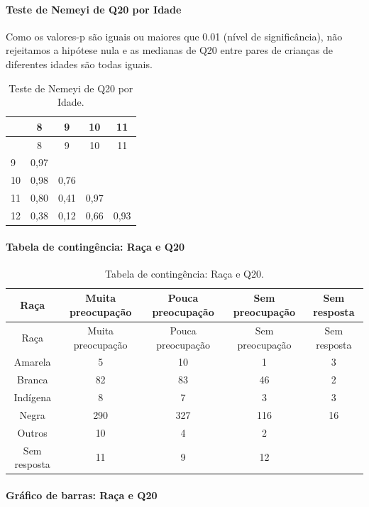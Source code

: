 \documentclass[]{article}
\let\oldparagraph\paragraph
\renewcommand{\paragraph}[1]{\oldparagraph{#1}\mbox{}}
\begin{document}
\hypertarget{teste-de-nemeyi-de-q20-por-idade}{%
\paragraph{Teste de Nemeyi de Q20 por Idade}\label{teste-de-nemeyi-de-q20-por-idade}}

Como os valores-p são iguais ou maiores que 0.01 (nível de significância), não rejeitamos a hipótese nula e as medianas de Q20 entre pares de crianças de diferentes idades são todas iguais.

\begin{longtable}[]{@{}lcccc@{}}
\caption{\label{tab:unnamed-chunk-396}Teste de Nemeyi de Q20 por Idade.}\tabularnewline
\toprule
& 8 & 9 & 10 & 11\tabularnewline
\midrule
\endfirsthead
\toprule
& 8 & 9 & 10 & 11\tabularnewline
\midrule
\endhead
9 & 0,97 & & &\tabularnewline
10 & 0,98 & 0,76 & &\tabularnewline
11 & 0,80 & 0,41 & 0,97 &\tabularnewline
12 & 0,38 & 0,12 & 0,66 & 0,93\tabularnewline
\bottomrule
\end{longtable}

\cleardoublepage

\hypertarget{tabela-de-continguxeancia-rauxe7a-e-q20}{%
\paragraph{Tabela de contingência: Raça e Q20}\label{tabela-de-continguxeancia-rauxe7a-e-q20}}

\begin{longtable}[]{@{}ccccc@{}}
\caption{\label{tab:unnamed-chunk-397}Tabela de contingência: Raça e Q20.}\tabularnewline
\toprule
Raça & Muita preocupação & Pouca preocupação & Sem preocupação & Sem resposta\tabularnewline
\midrule
\endfirsthead
\toprule
Raça & Muita preocupação & Pouca preocupação & Sem preocupação & Sem resposta\tabularnewline
\midrule
\endhead
Amarela & 5 & 10 & 1 & 3\tabularnewline
Branca & 82 & 83 & 46 & 2\tabularnewline
Indígena & 8 & 7 & 3 & 3\tabularnewline
Negra & 290 & 327 & 116 & 16\tabularnewline
Outros & 10 & 4 & 2 &\tabularnewline
Sem resposta & 11 & 9 & 12 &\tabularnewline
\bottomrule
\end{longtable}

\hypertarget{gruxe1fico-de-barras-rauxe7a-e-q20}{%
\paragraph{Gráfico de barras: Raça e Q20}\label{gruxe1fico-de-barras-rauxe7a-e-q20}}
\end{document}
